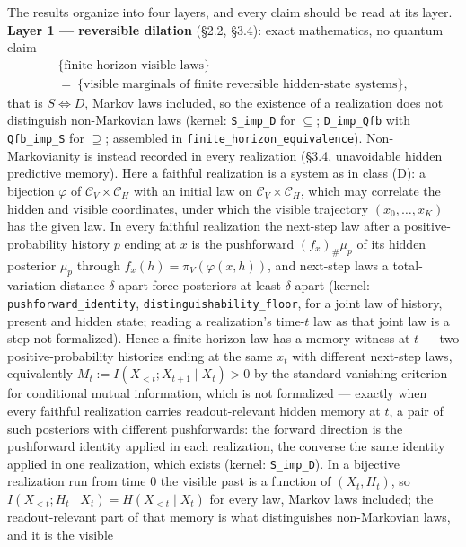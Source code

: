 \documentclass[
]{article}
\begin{document}
The results organize into four layers, and every claim should be read at
its layer. \textbf{Layer 1 --- reversible dilation} (§2.2, §3.4): exact
mathematics, no quantum claim ---
\[\begin{gathered}\{\text{finite-horizon visible laws}\}\\ =\ \{\text{visible marginals of finite reversible hidden-state systems}\},\end{gathered}\]
that is \(S \iff D\), Markov laws included, so the existence of a
realization does not distinguish non-Markovian laws (kernel:
\texttt{S\_imp\_D} for \(\subseteq\); \texttt{D\_imp\_Qfb} with
\texttt{Qfb\_imp\_S} for \(\supseteq\); assembled in
\texttt{finite\_horizon\_equivalence}). Non-Markovianity is instead
recorded in every realization (§3.4, unavoidable hidden predictive
memory). Here a faithful realization is a system as in class (D): a
bijection \(\varphi\) of \(\mathcal{C}_V \times \mathcal{C}_H\) with an
initial law on \(\mathcal{C}_V \times \mathcal{C}_H\), which may
correlate the hidden and visible coordinates, under which the visible
trajectory \((x_0, \ldots, x_K)\) has the given law. In every faithful
realization the next-step law after a positive-probability history \(p\)
ending at \(x\) is the pushforward \((f_x)_\#\mu_p\) of its hidden
posterior \(\mu_p\) through \(f_x(h) = \pi_V(\varphi(x,h))\), and
next-step laws a total-variation distance \(\delta\) apart force
posteriors at least \(\delta\) apart (kernel:
\texttt{pushforward\_identity}, \texttt{distinguishability\_floor}, for
a joint law of history, present and hidden state; reading a
realization's time-\(t\) law as that joint law is a step not
formalized). Hence a finite-horizon law has a memory witness at \(t\)
--- two positive-probability histories ending at the same \(x_t\) with
different next-step laws, equivalently
\(M_t := I(X_{<t}; X_{t+1} \mid X_t) > 0\) by the standard vanishing
criterion for conditional mutual information, which is not formalized
--- exactly when every faithful realization carries readout-relevant
hidden memory at \(t\), a pair of such posteriors with different
pushforwards: the forward direction is the pushforward identity applied
in each realization, the converse the same identity applied in one
realization, which exists (kernel: \texttt{S\_imp\_D}). In a bijective
realization run from time 0 the visible past is a function of
\((X_t, H_t)\), so \(I(X_{<t}; H_t \mid X_t) = H(X_{<t} \mid X_t)\) for
every law, Markov laws included; the readout-relevant part of that
memory is what distinguishes non-Markovian laws, and it is the visible
\end{document}
